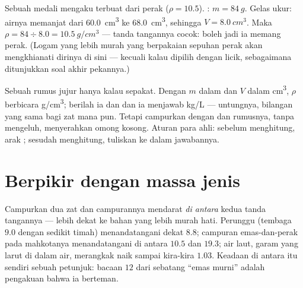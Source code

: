 \begin{example}\label{ex:g7:volume-mass-density:solid}
Sebuah medali mengaku terbuat dari perak ($\rho = 10.5$). :
$m = \qty{84}{g}$. Gelas ukur: airnya memanjat dari \qty{60.0}{cm^3} ke
\qty{68.0}{cm^3}, sehingga $V = \qty{8.0}{cm^3}$. Maka
$\rho = 84 \div 8.0 = \qty{10.5}{g/cm^3}$ --- tanda tangannya
cocok: boleh jadi ia memang perak. (Logam yang lebih murah yang
berpakaian sepuhan perak akan mengkhianati dirinya di sini ---
kecuali kalau dipilih dengan licik, sebagaimana ditunjukkan soal akhir
pekannya.)
\end{example}

\begin{remark}\label{rem:g7:volume-mass-density:units}
Sebuah rumus jujur hanya kalau  sepakat. Dengan $m$ dalam
 dan $V$ dalam \unit{cm^3}, $\rho$ berbicara \unit{g/cm^3};
berilah ia  dan  dan ia menjawab \unit{kg/L} ---
untungnya, bilangan yang sama bagi zat mana pun. Tetapi campurkan 
dengan  dan rumusnya, tanpa mengeluh, menyerahkan omong kosong.
Aturan para ahli: sebelum menghitung, arak ; sesudah
menghitung, tuliskan  ke dalam jawabannya.
\end{remark}

\section{Berpikir dengan massa jenis}

\begin{example}\label{ex:g7:volume-mass-density:alloys}
Campurkan dua zat dan  campurannya mendarat \emph{di
antara} kedua tanda tangannya --- lebih dekat ke bahan yang lebih
murah hati. Perunggu (tembaga $9.0$ dengan sedikit timah)
menandatangani dekat $8.8$; campuran emas-dan-perak pada mahkotanya
menandatangani di antara $10.5$ dan $19.3$; air laut, garam yang
larut di dalam air, merangkak naik sampai kira-kira $1.03$. Keadaan di
antara itu sendiri sebuah petunjuk: bacaan $12$ dari sebatang ``emas
murni'' adalah pengakuan bahwa ia berteman.
\end{example}


